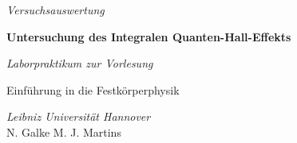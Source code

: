 
\vspace*{0.3cm}

\begin{center}

\Large
\textit{Versuchsauswertung}

\vspace{0.7cm}

\huge
\textbf{Untersuchung des Integralen Quanten-Hall-Effekts}

\vspace{1.1cm}

\Large
\textit{Laborpraktikum zur Vorlesung}

\vspace{0.2cm}

Einführung in die Festkörperphysik


\vspace{2cm}

\Large
\textit{Leibniz Universität Hannover}\\
\vspace{0.5cm}
N. Galke \hspace{1cm} M. J. Martins

\end{center}

\normalsize

\vspace{1.4cm}


\clearpage

\doublespacing
\tableofcontents

\clearpage

\setcounter{page}{1}

\singlespacing
